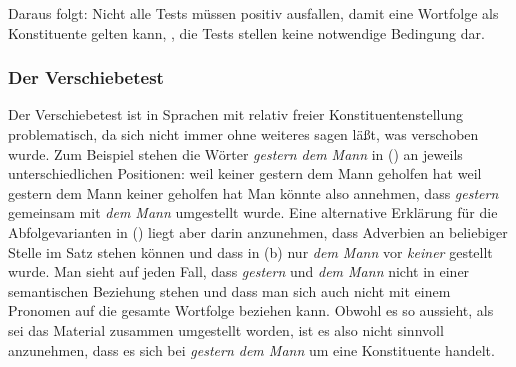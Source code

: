 Daraus folgt: Nicht alle Tests müssen positiv ausfallen, damit eine Wortfolge als Konstituente gelten kann,
\dash, die Tests stellen keine notwendige Bedingung dar.




\subsubsection{Der Verschiebetest}

Der Verschiebetest ist in Sprachen mit relativ freier Konstituentenstellung problematisch, da sich
nicht immer ohne weiteres sagen läßt, was verschoben wurde. Zum Beispiel stehen die Wörter
\emph{gestern dem Mann} in () an jeweils unterschiedlichen Positionen:
\eal
\ex weil keiner gestern dem Mann geholfen hat
\ex weil gestern dem Mann keiner geholfen hat
\zl
Man könnte also annehmen, dass \emph{gestern} gemeinsam mit \emph{dem Mann} umgestellt wurde. Eine
alternative Erklärung für die Abfolgevarianten in () liegt aber darin anzunehmen, dass
Adverbien an beliebiger Stelle im Satz stehen können und dass in (b) nur \emph{dem Mann} vor
\emph{keiner} gestellt wurde. Man sieht auf jeden Fall, dass \emph{gestern} und \emph{dem Mann} nicht
in einer semantischen Beziehung stehen und dass man sich auch nicht mit einem Pronomen auf die
gesamte Wortfolge beziehen kann. Obwohl es so aussieht, als sei das Material zusammen umgestellt
worden, ist es also nicht sinnvoll anzunehmen, dass es sich bei \emph{gestern dem Mann} um eine
Konstituente handelt.


